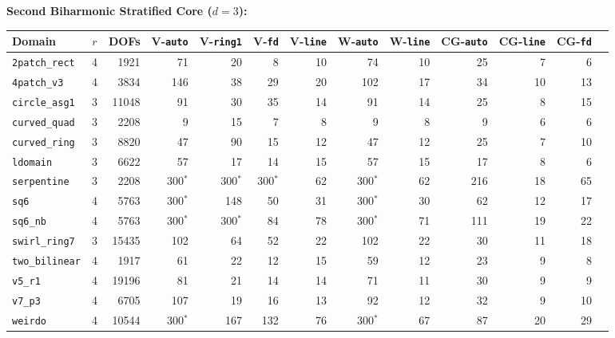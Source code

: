 \documentclass[10pt,a4paper]{article}
\begin{document}
\medskip
\noindent\textbf{Second Biharmonic Stratified Core ($d=3$):}
\begin{center}
\scriptsize
\setlength{\tabcolsep}{3.5pt}
\begin{tabular}{@{}lcrrrrrrrrrrr@{}}
\toprule
\textbf{Domain} & $r$ & \textbf{DOFs} & \textbf{V-\texttt{auto}} & \textbf{V-\texttt{ring1}} & \textbf{V-\texttt{fd}} & \textbf{V-\texttt{line}} & \textbf{W-\texttt{auto}} & \textbf{W-\texttt{line}} & \textbf{CG-\texttt{auto}} & \textbf{CG-\texttt{line}} & \textbf{CG-\texttt{fd}} \\
\midrule
\texttt{2patch\_rect} & 4 & 1921 & 71 & 20 & 8 & 10 & 74 & 10 & 25 & 7 & 6 \\
\texttt{4patch\_v3} & 4 & 3834 & 146 & 38 & 29 & 20 & 102 & 17 & 34 & 10 & 13 \\
\texttt{circle\_asg1} & 3 & 11048 & 91 & 30 & 35 & 14 & 91 & 14 & 25 & 8 & 15 \\
\texttt{curved\_quad} & 3 & 2208 & 9 & 15 & 7 & 8 & 9 & 8 & 9 & 6 & 6 \\
\texttt{curved\_ring} & 3 & 8820 & 47 & 90 & 15 & 12 & 47 & 12 & 25 & 7 & 10 \\
\texttt{ldomain} & 3 & 6622 & 57 & 17 & 14 & 15 & 57 & 15 & 17 & 8 & 6 \\
\texttt{serpentine} & 3 & 2208 & 300$^*$ & 300$^*$ & 300$^*$ & 62 & 300$^*$ & 62 & 216 & 18 & 65 \\
\texttt{sq6} & 4 & 5763 & 300$^*$ & 148 & 50 & 31 & 300$^*$ & 30 & 62 & 12 & 17 \\
\texttt{sq6\_nb} & 4 & 5763 & 300$^*$ & 300$^*$ & 84 & 78 & 300$^*$ & 71 & 111 & 19 & 22 \\
\texttt{swirl\_ring7} & 3 & 15435 & 102 & 64 & 52 & 22 & 102 & 22 & 30 & 11 & 18 \\
\texttt{two\_bilinear} & 4 & 1917 & 61 & 22 & 12 & 15 & 59 & 12 & 23 & 9 & 8 \\
\texttt{v5\_r1} & 4 & 19196 & 81 & 21 & 14 & 14 & 71 & 11 & 30 & 9 & 9 \\
\texttt{v7\_p3} & 4 & 6705 & 107 & 19 & 16 & 13 & 92 & 12 & 32 & 9 & 10 \\
\texttt{weirdo} & 4 & 10544 & 300$^*$ & 167 & 132 & 76 & 300$^*$ & 67 & 87 & 20 & 29 \\
\bottomrule
\end{tabular}
\end{center}
\end{document}
